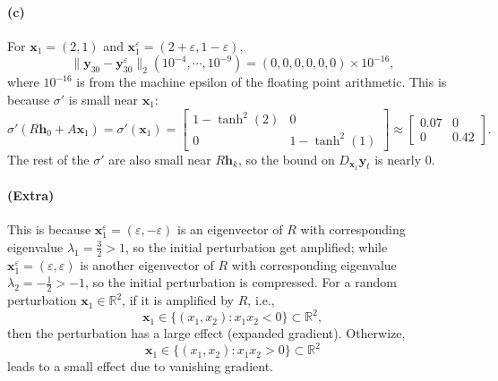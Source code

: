 \documentclass[12pt]{article}
\begin{document}
\paragraph{(c)}
For \(\mathbf{x}_1=(2, 1)\) and \(\mathbf{x}_1^\varepsilon=(2+\varepsilon, 1-\varepsilon)\),
\[ \|\mathbf{y}_{30}-\mathbf{y}_{30}^\varepsilon\|_2(10^{-4},\cdots,10^{-9})=(0, 0, 0, 0, 0, 0) \times10^{-16}, \]
where \(10^{-16}\) is from the machine epsilon of the floating point arithmetic.
This is because \(\sigma'\) is small near \(\mathbf{x}_1\):
\[ \sigma'(R\mathbf{h}_0+A\mathbf{x}_1)=\sigma'(\mathbf{x}_1)=\begin{bmatrix} 1-\tanh^2(2) & 0 \\ 0 & 1-\tanh^2(1) \end{bmatrix} \approx \begin{bmatrix}0.07 & 0 \\ 0 & 0.42 \end{bmatrix}. \]
The rest of the \(\sigma'\) are also small near \(R\mathbf{h}_k\), so the bound on \(D_{\mathbf{x}_1}\mathbf{y}_t\) is nearly 0.
\paragraph{(Extra)}
This is because \(\mathbf{x}_1^\varepsilon=(\varepsilon, -\varepsilon)\) is an eigenvector of \(R\) with corresponding eigenvalue \(\lambda_1=\frac{3}{2}>1\), so the initial perturbation get amplified; while \(\mathbf{x}_1^\varepsilon=(\varepsilon, \varepsilon)\) is another eigenvector of \(R\) with corresponding eigenvalue \(\lambda_2=-\frac{1}{2}>-1\), so the initial perturbation is compressed.
For a random perturbation \(\mathbf{x}_1\in\mathbb{R}^2\), if it is amplified by \(R\), i.e.,
\[ \mathbf{x}_1\in\{(x_1, x_2): x_1 x_2 < 0 \}\subset\mathbb{R}^2, \]
then the perturbation has a large effect (expanded gradient).
Otherwize,
\[ \mathbf{x}_1\in\{(x_1, x_2): x_1 x_2 > 0 \}\subset\mathbb{R}^2 \]
leads to a small effect due to vanishing gradient.
\inputminted[breaklines=true, linenos=true]{python}{./Homework3/ex3.py}
\end{document}

